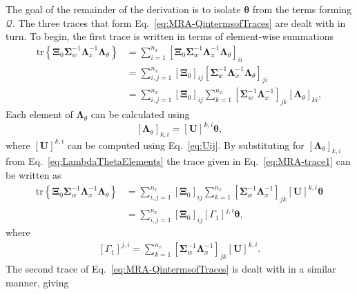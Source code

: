 \documentclass[review,authoryear,3p]{elsarticle}
\begin{document}
The goal of the remainder of the derivation is to isolate $\boldsymbol\theta$ from the terms forming $\mathcal{Q}$. The three traces that form Eq.~\eqref{eq:MRA-QintermsofTraces} are dealt with in turn. To begin, the first trace is written in terms of element-wise summations
\begin{align}\label{eq:MRA-trace1}
\mathrm{tr} \left\lbrace \boldsymbol \Xi_0\boldsymbol\Sigma_w^{-1}\boldsymbol\Lambda_x^{-1}\boldsymbol\Lambda_{\theta}\right\rbrace&=\sum_{i=1}^{n_x}\left[ \boldsymbol \Xi_0\boldsymbol\Sigma_w^{-1}\boldsymbol\Lambda_x^{-1}\boldsymbol\Lambda_{\theta}\right]_{ii} \nonumber \\
&=\sum_{i,j=1}^{n_x}\left[ \boldsymbol\Xi_0\right]_{ij}\left[\boldsymbol\Sigma_w^{-1}\boldsymbol\Lambda_x^{-1}  \boldsymbol\Lambda_{\theta}\right]_{ji}\nonumber\\
&=\sum_{i,j=1}^{n_x}\left[ \boldsymbol\Xi_0\right]_{ij}\sum_{k=1}^{n_x}\left[\boldsymbol\Sigma_w^{-1}\boldsymbol\Lambda_x^{-1} \right]_{jk} \left[ \boldsymbol\Lambda_{\theta}\right]_{ki},
\end{align}
Each element of $\boldsymbol\Lambda_{\theta}$ can be calculated using
\begin{equation}\label{eq:LambdaThetaElements}
\left[ \boldsymbol\Lambda_{\theta}\right] _{k,i}=\left[ \mathbf U\right]^{k,i}\boldsymbol\theta,
\end{equation}
where $\left[ \mathbf U\right] ^{k,i}$ can be computed using Eq.~\eqref{eq:Uij}. By substituting for $\left[ \boldsymbol\Lambda_{\theta}\right] _{k,i}$ from Eq.~\eqref{eq:LambdaThetaElements} the trace given in Eq.~\eqref{eq:MRA-trace1} can be written as
\begin{align}
\mathrm{tr} \left\lbrace \boldsymbol \Xi_0\boldsymbol\Sigma_w^{-1}\boldsymbol\Lambda_x^{-1}\boldsymbol\Lambda_{\theta}\right\rbrace&=\sum_{i,j=1}^{n_x}\left[ \boldsymbol\Xi_0\right]_{ij}\sum_{k=1}^{n_x}\left[ \boldsymbol\Sigma_w^{-1}\boldsymbol\Lambda_x^{-1}\right]_{jk} \left[ \mathbf U\right]^{k,i}\boldsymbol\theta \nonumber \\
&=\sum_{i,j=1}^{n_x}\left[ \boldsymbol\Xi_0\right]_{ij}\left[ \Gamma_1\right] ^{j,i}\boldsymbol\theta,
\end{align}
where
\begin{align}
\left[ \Gamma_1\right]^{j,i} =\sum_{k=1}^{n_x}\left[ \boldsymbol\Sigma_w^{-1}\boldsymbol\Lambda_x^{-1}\right]_{jk} \left[ \mathbf U\right]^{k,i}.
\end{align}
The second trace of Eq.~\eqref{eq:MRA-QintermsofTraces} is dealt with in a similar manner, giving
\end{document}
